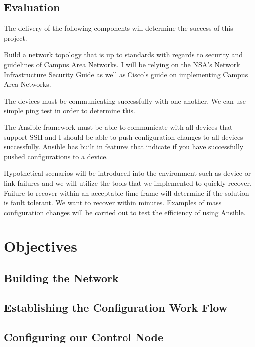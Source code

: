 \documentclass[12pt, letterpaper]{article}
\begin{document}
\medskip


	\subsection{Evaluation}
The delivery of the following components will determine the success of this project.

\medskip

Build a network topology that is up to standards with regards to security and guidelines of Campus Area Networks. I will be relying on the NSA’s Network Infrastructure Security Guide as well as Cisco’s guide on implementing Campus Area Networks. 

\medskip

The devices must be communicating successfully with one another. We can use simple ping test in order to determine this. 

\medskip

The Ansible framework must be able to communicate with all devices that support SSH and I should be able to push configuration changes to all devices successfully. Ansible has built in features that indicate if you have successfully pushed configurations to a device. 

\medskip

Hypothetical scenarios will be introduced into the environment such as device or link failures and we will utilize the tools that we implemented to quickly recover. Failure to recover within an acceptable time frame will determine if the solution is fault tolerant. We want to recover within minutes. Examples of mass configuration changes will be carried out to test the efficiency of using Ansible. 


\newpage

\section{Objectives}

	\subsection{Building the Network}
		
	\subsection{Establishing the Configuration Work Flow}

	\subsection{Configuring our Control Node}
		
\end{document}
